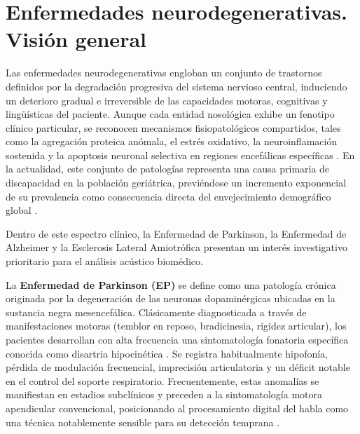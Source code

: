 

\section{Enfermedades neurodegenerativas. Visión general}\label{sec:vision_general}

Las enfermedades neurodegenerativas engloban un conjunto de trastornos definidos por la degradación progresiva del sistema nervioso central, induciendo un deterioro gradual e irreversible de las capacidades motoras, cognitivas y lingüísticas del paciente. Aunque cada entidad nosológica exhibe un fenotipo clínico particular, se reconocen mecanismos fisiopatológicos compartidos, tales como la agregación proteica anómala, el estrés oxidativo, la neuroinflamación sostenida y la apoptosis neuronal selectiva en regiones encefálicas específicas \cite{abrilcarreres2024}. En la actualidad, este conjunto de patologías representa una causa primaria de discapacidad en la población geriátrica, previéndose un incremento exponencial de su prevalencia como consecuencia directa del envejecimiento demográfico global \cite{avance2023}. 

Dentro de este espectro clínico, la Enfermedad de Parkinson, la Enfermedad de Alzheimer y la Esclerosis Lateral Amiotrófica presentan un interés investigativo prioritario para el análisis acústico biomédico.

La \textbf{Enfermedad de Parkinson (EP)} se define como una patología crónica originada por la degeneración de las neuronas dopaminérgicas ubicadas en la sustancia negra mesencefálica. Clásicamente diagnosticada a través de manifestaciones motoras (temblor en reposo, bradicinesia, rigidez articular), los pacientes desarrollan con alta frecuencia una sintomatología fonatoria específica conocida como disartria hipocinética \cite{romero2018}. Se registra habitualmente hipofonía, pérdida de modulación frecuencial, imprecisión articulatoria y un déficit notable en el control del soporte respiratorio. Frecuentemente, estas anomalías se manifiestan en estadios subclínicos y preceden a la sintomatología motora apendicular convencional, posicionando al procesamiento digital del habla como una técnica notablemente sensible para su detección temprana \cite{mendes2024}.

